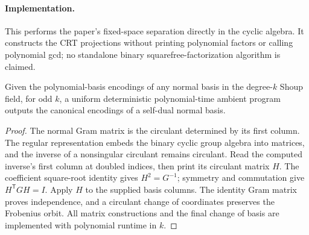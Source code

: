 \paragraph{Implementation.} This performs the paper's fixed-space separation
directly in the cyclic algebra. It constructs the CRT projections without
printing polynomial factors or calling polynomial gcd; no standalone binary
squarefree-factorization algorithm is claimed.

\begin{lemma}
\label{lem:effective-normal-selfdualization}
\leanok
Given the polynomial-basis encodings of any normal basis in the degree-$k$ Shoup
field, for odd $k$, a uniform deterministic polynomial-time ambient program
outputs the canonical encodings of a self-dual normal basis.
\end{lemma}
\begin{proof}
\leanok
The normal Gram matrix is the circulant determined by its first column. The
regular representation embeds the binary cyclic group algebra into matrices,
and the inverse of a nonsingular circulant remains circulant. Read the computed
inverse's first column at doubled indices, then print its circulant matrix $H$.
The coefficient square-root identity gives $H^2=G^{-1}$; symmetry and commutation
give $H^{\mathsf T}GH=I$. Apply $H$ to the supplied basis columns. The identity
Gram matrix proves independence, and a circulant change of coordinates preserves
the Frobenius orbit. All matrix constructions and the final change of basis are
implemented with polynomial runtime in $k$.
\end{proof}
